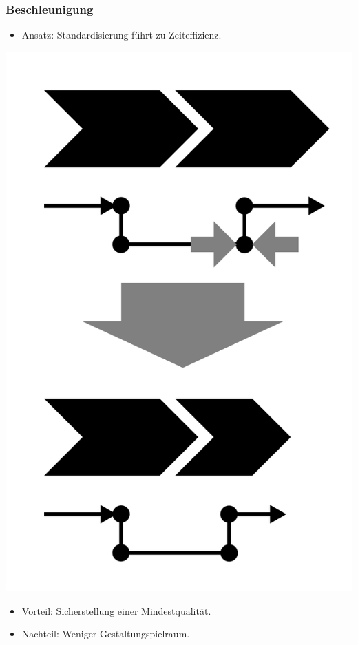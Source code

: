 \documentclass{beamer}
\begin{document}
 \begin{frame}
  \frametitle{Beschleunigung}
  \begin{itemize}
    \item Ansatz: Standardisierung führt zu Zeiteffizienz.
  \end{itemize}
  \centerline{\includegraphics[scale=2.5]{4_6_2.png}}
  \begin{itemize}
    \item Vorteil: Sicherstellung einer Mindestqualität.
    \item Nachteil: Weniger Gestaltungspielraum.
  \end{itemize}
 \end{frame}
\end{document}
